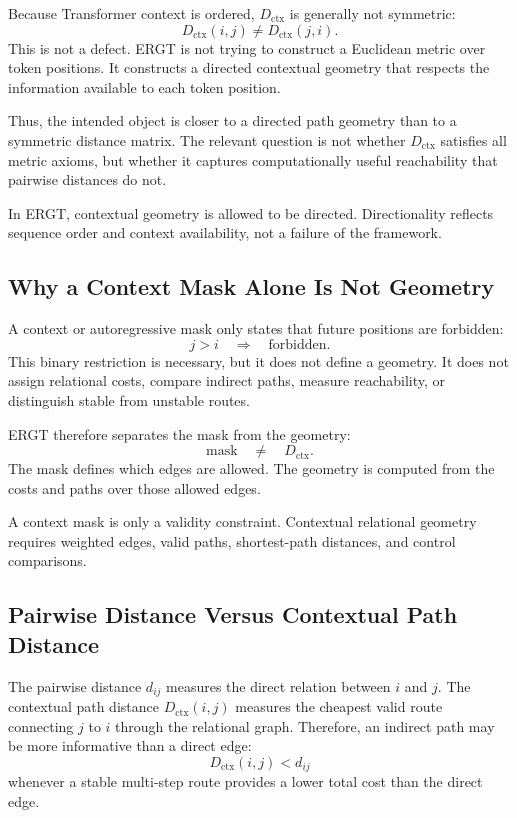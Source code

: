 \documentclass[11pt]{article}
\begin{document}
Because Transformer context is ordered, $D_{\mathrm{ctx}}$ is generally not symmetric:
\[
D_{\mathrm{ctx}}(i,j)\neq D_{\mathrm{ctx}}(j,i).
\]
This is not a defect. ERGT is not trying to construct a Euclidean metric over token positions. It constructs a directed contextual geometry that respects the information available to each token position.

Thus, the intended object is closer to a directed path geometry than to a symmetric distance matrix. The relevant question is not whether $D_{\mathrm{ctx}}$ satisfies all metric axioms, but whether it captures computationally useful reachability that pairwise distances do not.

\begin{ergtclaim}
In ERGT, contextual geometry is allowed to be directed. Directionality reflects sequence order and context availability, not a failure of the framework.
\end{ergtclaim}

\subsection{Why a Context Mask Alone Is Not Geometry}

A context or autoregressive mask only states that future positions are forbidden:
\[
j>i\quad\Rightarrow\quad \mathrm{forbidden}.
\]
This binary restriction is necessary, but it does not define a geometry. It does not assign relational costs, compare indirect paths, measure reachability, or distinguish stable from unstable routes.

ERGT therefore separates the mask from the geometry:
\[
\mathrm{mask}\quad\neq\quad D_{\mathrm{ctx}}.
\]
The mask defines which edges are allowed. The geometry is computed from the costs and paths over those allowed edges.

\begin{ergtclaim}
A context mask is only a validity constraint. Contextual relational geometry requires weighted edges, valid paths, shortest-path distances, and control comparisons.
\end{ergtclaim}

\subsection{Pairwise Distance Versus Contextual Path Distance}

The pairwise distance $d_{ij}$ measures the direct relation between $i$ and $j$. The contextual path distance $D_{\mathrm{ctx}}(i,j)$ measures the cheapest valid route connecting $j$ to $i$ through the relational graph. Therefore, an indirect path may be more informative than a direct edge:
\[
D_{\mathrm{ctx}}(i,j)<d_{ij}
\]
whenever a stable multi-step route provides a lower total cost than the direct edge.
\end{document}

